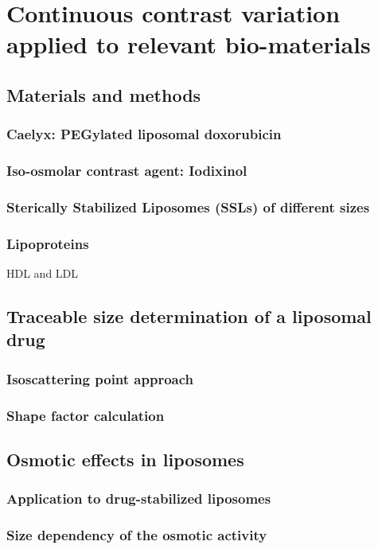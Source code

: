 \chapter{Continuous contrast variation applied to relevant bio-materials}
\label{chap:bio_applications}

\section{Materials and methods}
\subsection{Caelyx: PEGylated liposomal doxorubicin}
\subsection{Iso-osmolar contrast agent: Iodixinol}
\subsection{Sterically Stabilized Liposomes (SSLs) of different sizes}
\subsection{Lipoproteins}
HDL and LDL

\section{Traceable size determination of a liposomal drug}
\subsection{Isoscattering point approach}
\subsection{Shape factor calculation}

\section{Osmotic effects in liposomes}
\subsection{Application to drug-stabilized liposomes}
\subsection{Size dependency of the osmotic activity}


